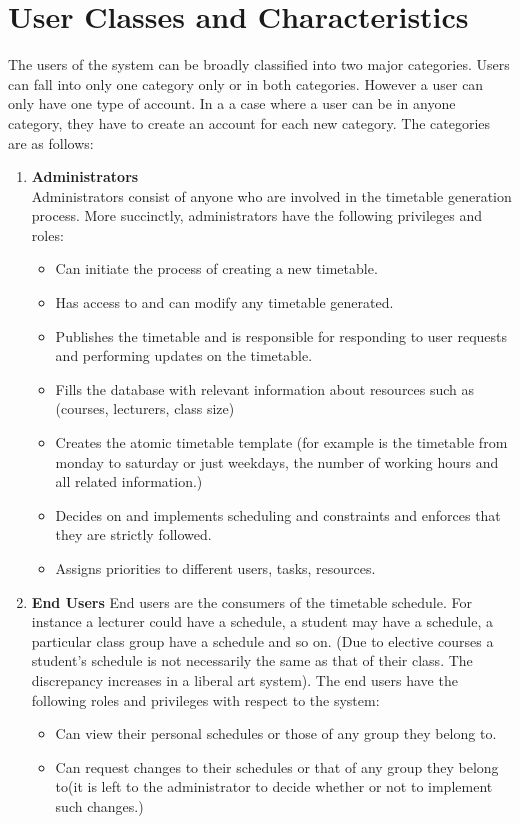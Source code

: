 \documentclass{scrreprt}
\begin{document}
\section{User Classes and Characteristics}
The users of the system can be broadly classified into two major categories. Users can fall into only one category only or in both categories. However a user can only have one type of account. In a a case where a user can be in anyone category, they have to create an account for each new category. The categories are as follows:
\begin{enumerate}
\item \textbf{Administrators}\\
Administrators consist of anyone who are involved in the timetable generation process. More succinctly, administrators have the following privileges and roles:
 \begin{itemize}
 \item Can initiate the process of creating a new timetable.
 \item Has access to and can modify any timetable generated.
 \item Publishes the timetable and is responsible for responding to user requests and performing updates on the timetable.
 \item Fills the database with relevant information about resources such as (courses, lecturers, class size)
 \item Creates the atomic timetable template (for example is the timetable from monday to saturday or just weekdays, the number of working hours and all related information.)
 \item Decides on and implements scheduling and constraints and enforces that they are strictly followed.
 \item Assigns priorities to different users, tasks, resources.
 \end{itemize}
\item \textbf{End Users}
End users are the consumers of the timetable schedule. For instance a lecturer could have a schedule, a student may have a schedule, a particular class group have a schedule and so on. (Due to elective courses a student's schedule is not necessarily the same as that of their class. The discrepancy increases in a liberal art system). The end users have the following roles and privileges with respect to the system:
 \begin{itemize}
 \item Can view their personal schedules or those of any group they belong to.
 \item Can request changes to their schedules or that of any group they belong to(it is left to the administrator to decide whether or not to implement such changes.) 
 \end{itemize}
\end{enumerate}
\end{document}
